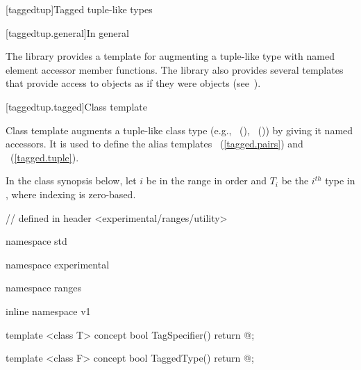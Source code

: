\setcounter{section}{14}

\begin{addedblock}
[taggedtup]{Tagged tuple-like types}

[taggedtup.general]{In general}

\pnum The library provides a template for augmenting a tuple-like type with named element accessor
member functions. The library also provides several templates that provide access to 
objects as if they were  objects (see~).


[taggedtup.tagged]{Class template }

\pnum
Class template  augments a tuple-like class type (e.g., ~(),
~()) by giving it named accessors. It is used to define the alias
templates ~(\ref{tagged.pairs}) and
~(\ref{tagged.tuple}).

\pnum In the class synopsis below, let $i$ be in the range
 in order and $T_i$ be the $i^{th}$ type in , where indexing
is zero-based.

%
\begin{codeblock}
// defined in header <experimental/ranges/utility>

namespace std { namespace experimental { namespace ranges { inline namespace v1 {
  template <class T>
  concept bool TagSpecifier() {
    return @\impdef@;
  }

  template <class F>
  concept bool TaggedType() {
    return @\impdef@;
  }

}}}}
\end{codeblock}
\end{addedblock}
